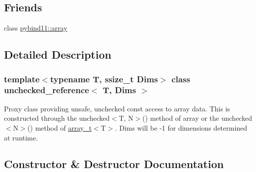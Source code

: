 \subsection*{Friends}
\begin{DoxyCompactItemize}
\item 
class \mbox{\hyperlink{classunchecked__reference_abcb10178a21ebe8e899ca951b2e68608}{pybind11\+::array}}
\end{DoxyCompactItemize}


\subsection{Detailed Description}
\subsubsection*{template$<$typename T, ssize\+\_\+t Dims$>$\newline
class unchecked\+\_\+reference$<$ T, Dims $>$}

Proxy class providing unsafe, unchecked const access to array data. This is constructed through the {\ttfamily unchecked$<$T, N$>$()} method of {\ttfamily array} or the {\ttfamily unchecked$<$N$>$()} method of {\ttfamily \mbox{\hyperlink{classarray__t}{array\+\_\+t}}$<$T$>$}. {\ttfamily Dims} will be -\/1 for dimensions determined at runtime. 

\subsection{Constructor \& Destructor Documentation}
\mbox{\label{classunchecked__reference_ae5522c90828ed6a7c58687e6969ef97c}} 
